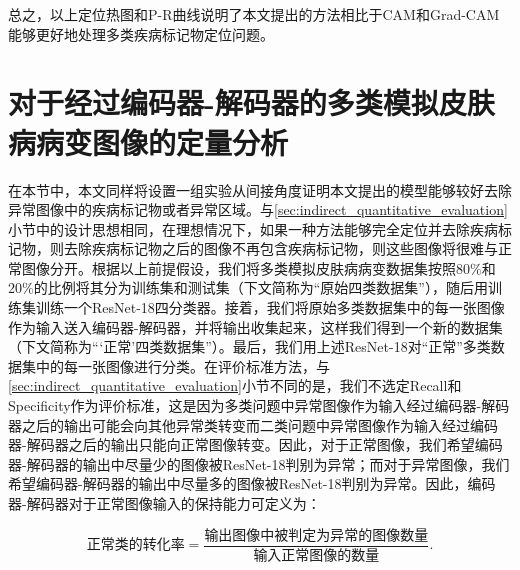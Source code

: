 总之，以上定位热图和P-R曲线说明了本文提出的方法相比于CAM和Grad-CAM能够更好地处理多类疾病标记物定位问题。
\section{对于经过编码器-解码器的多类模拟皮肤病病变图像的定量分析}
在本节中，本文同样将设置一组实验从间接角度证明本文提出的模型能够较好去除异常图像中的疾病标记物或者异常区域。与\ref{sec:indirect_quantitative_evaluation}小节中的设计思想相同，在理想情况下，如果一种方法能够完全定位并去除疾病标记物，则去除疾病标记物之后的图像不再包含疾病标记物，则这些图像将很难与正常图像分开。根据以上前提假设，我们将多类模拟皮肤病病变数据集按照$80\%$和$20\%$的比例将其分为训练集和测试集（下文简称为“原始四类数据集”），随后用训练集训练一个ResNet-18四分类器。接着，我们将原始多类数据集中的每一张图像作为输入送入编码器-解码器，并将输出收集起来，这样我们得到一个新的数据集（下文简称为“‘正常’四类数据集”）。最后，我们用上述ResNet-18对“正常”多类数据集中的每一张图像进行分类。在评价标准方法，与\ref{sec:indirect_quantitative_evaluation}小节不同的是，我们不选定Recall和Specificity作为评价标准，这是因为多类问题中异常图像作为输入经过编码器-解码器之后的输出可能会向其他异常类转变而二类问题中异常图像作为输入经过编码器-解码器之后的输出只能向正常图像转变。因此，对于正常图像，我们希望编码器-解码器的输出中尽量少的图像被ResNet-18判别为异常；而对于异常图像，我们希望编码器-解码器的输出中尽量多的图像被ResNet-18判别为异常。因此，编码器-解码器对于正常图像输入的保持能力可定义为：

\begin{equation}\label{equ:normal_imgs_kep_rate}
\text{正常类的转化率}=\frac{\text{输出图像中被判定为异常的图像数量}}{\text{输入正常图像的数量}}.
\end{equation}

